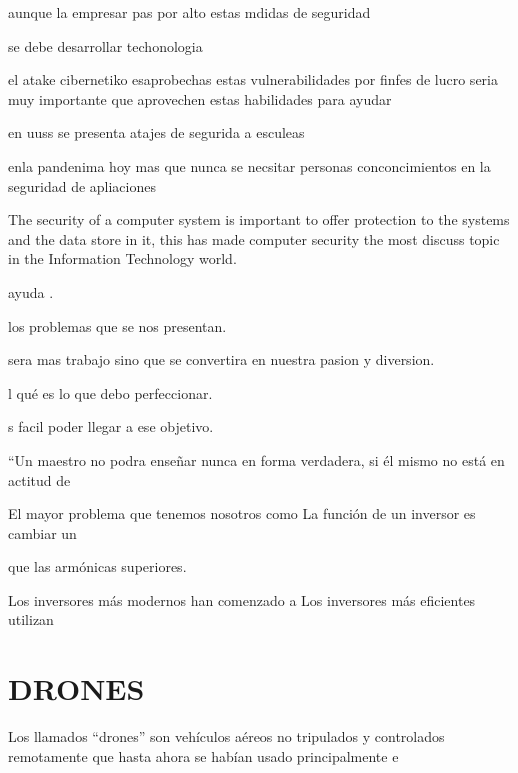 \documentclass[12pt]{article}
\begin{document}
aunque la empresar pas por alto estas mdidas de seguridad 

se debe desarrollar techonologia 


el atake cibernetiko esaprobechas estas vulnerabilidades por finfes de lucro seria muy importante que aprovechen  estas habilidades para ayudar 


en uuss se presenta atajes de segurida a esculeas 

enla pandenima hoy mas que nunca se necsitar personas conconcimientos en la seguridad de apliaciones 



The security of a computer system is important to offer protection to the systems and the data store in it, this has made computer security the most discuss topic in the Information Technology world.


\vspace{10PT}
 ayuda .

\vspace{15PT}
 los problemas que se nos presentan.

\vspace{15PT}
 sera mas trabajo sino que se convertira en nuestra pasion y diversion.

\vspace{15PT}
l qué es lo que debo perfeccionar.

\vspace{15PT}
s facil poder llegar a ese objetivo.
 
\vspace{15PT}
“Un maestro no podra enseñar nunca en forma verdadera, si él mismo no está en actitud de 

\vspace{15PT}
El mayor problema que tenemos nosotros como 
La función de un inversor es cambiar un 

\vspace{15PT}
que las armónicas superiores.

\vspace{15PT}
Los inversores más modernos han comenzado a 
\vspace{15PT}
Los inversores más eficientes utilizan 



\vspace{30pt}
\section{DRONES}

Los llamados “drones” son vehículos aéreos no tripulados y controlados remotamente que hasta ahora se habían usado principalmente e

 
\end{document}
